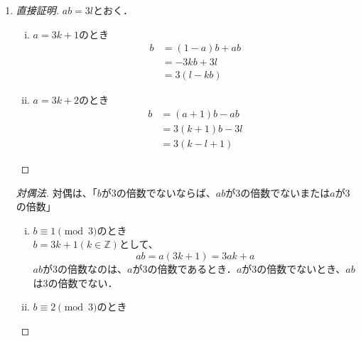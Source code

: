 \documentclass[a4paper,12pt]{ltjsarticle}
\begin{document}
\begin{enumerate}[(1)]
\begin{proof}[背理法]
\begin{enumerate}[(i)]
                    $n = 3k + 2 (k \in \mathbb{Z})$として、
                    \begin{equation*}
                        5n = 15k + 10 = 3(5k + 3) + 1
                    \end{equation*}
            \end{enumerate}
            これは、$5n$が3の倍数であることと矛盾．
        \end{proof}
    \item
        \begin{proof}[直接証明]
            $ab = 3l$とおく．
            \begin{enumerate}[(i)]
                \item $a = 3k + 1$のとき \\
                    \begin{align*}
                        b &= (1 - a)b + ab \\
                          &= -3kb + 3l \\
                          &= 3(l - kb)
                    \end{align*}
                \item $a = 3k + 2$のとき \\
                    \begin{align*}
                        b &= (a + 1)b - ab \\
                          &= 3(k + 1)b - 3l \\
                          &= 3(k - l + 1)
                    \end{align*}
            \end{enumerate}
        \end{proof}
        \begin{proof}[対偶法]
            対偶は、「$b$が3の倍数でないならば、$ab$が3の倍数でないまたは$a$が3の倍数」
            \begin{enumerate}[(i)]
                \item $b \equiv 1 \pmod 3$のとき \\
                    $b = 3k + 1 (k \in \mathbb{Z})$として、
                    \begin{equation*}
                        ab = a(3k + 1) = 3ak + a
                    \end{equation*}
                    $ab$が3の倍数なのは、$a$が3の倍数であるとき．$a$が3の倍数でないとき、$ab$は3の倍数でない．
                \item $b \equiv 2 \pmod 3$のとき \\

\end{enumerate}
\end{proof}
\end{enumerate}
\end{document}
